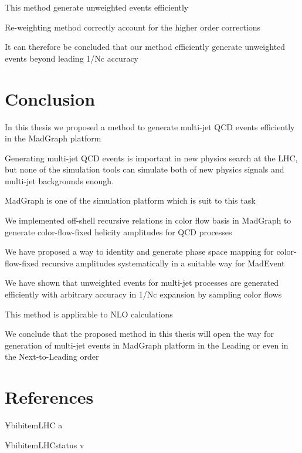 \documentclass{book}
\begin{document}
This method generate unweighted events efficiently

Re-weighting method correctly account for the higher order corrections

It can therefore be concluded that our method efficiently generate unweighted events beyond leading 1/Nc accuracy

\chapter{Conclusion}
In this thesis we proposed a method to generate multi-jet QCD events efficiently in the MadGraph platform

Generating multi-jet QCD events is important in new physics search at the LHC, but none of the simulation tools can simulate both of new physics signals and multi-jet backgrounds enough.

MadGraph is one of the simulation platform which is suit to this task

We implemented off-shell recursive relations in color flow basis in MadGraph to generate color-flow-fixed helicity amplitudes for QCD processes

We have proposed a way to identity and generate phase space mapping for color-flow-fixed recursive amplitudes systematically in a suitable way for MadEvent

We have shown that unweighted events for multi-jet processes are generated efficiently with arbitrary accuracy in 1/Nc expansion by sampling color flows

This method is applicable to NLO calculations

We conclude that the proposed method in this thesis will open the way for generation of multi-jet events in MadGraph platform in the Leading or even in the Next-to-Leading order

\chapter{References}
¥bibitem{LHC} a

¥bibitem{LHCstatus} v

\end{document}
